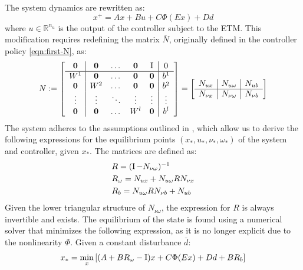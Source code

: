 \documentclass{ifacconf}
\theoremstyle{plain}
\begin{document}
The system dynamics are rewritten as:
\begin{equation}\label{eqn:system-dynamics}
x^{+} = A x + B u + C \Phi(E x) + D d
\end{equation}
where $u \in \mathbb{R}^{n_u}$ is the output of the controller subject to the ETM. This modification requires redefining the matrix $\overbar N$, originally defined in the controller policy \eqref{eqn:first-N}, as:
\begin{equation}\label{eqn:last-N}
  N := \left[\begin{matrix}
    \begin{array}{c | c c c c | c}
      \operatorname{\mathbf{0}} & \operatorname{\mathbf{0}} & \dots & \operatorname{\mathbf{0}} & \operatorname{I} & 0 \\ 
      \hline
      W^1 & \operatorname{\mathbf{0}} & \dots & \operatorname{\mathbf{0}} & \operatorname{\mathbf{0}} & b^1 \\
      \operatorname{\mathbf{0}} & W^2 & \dots & \operatorname{\mathbf{0}} & \operatorname{\mathbf{0}} & b^2 \\
      \vdots & \vdots & \ddots & \vdots & \vdots & \vdots \\
      \operatorname{\mathbf{0}} & \operatorname{\mathbf{0}} & \dots & W^l & \operatorname{\mathbf{0}} & b^l
    \end{array}
  \end{matrix}\right] = \left[\begin{matrix}
    \begin{array}{c | c | c}
    N_{u x} & N_{u \omega} & N_{u b} \\
    \hline
    N_{\nu x} & N_{\nu \omega} & N_{\nu b}
    \end{array} 
  \end{matrix}\right]
\end{equation}
The system adheres to the assumptions outlined in \citep[Lemma 2]{css-extended}, which allow us to derive the following expressions for the equilibrium points $\left( x_*, u_*, \nu_*, \omega_* \right)$ of the system and controller, given $x_*$. The matrices are defined as:
\begin{equation}
    \begin{aligned}
         &R = (\operatorname{I} - N_{\nu \omega})^{-1}\\
         &R_{\omega} = N_{u x} + N_{u \omega} R N_{\nu x}\\
         &R_b = N_{u \omega} R N_{\nu b} + N_{u b}
    \end{aligned}
\end{equation}
Given the lower triangular structure of $N_{\nu \omega}$, the expression for $R$ is always invertible and exists. The equilibrium of the state is found using a numerical solver that minimizes the following expression, as it is no longer explicit due to the nonlinearity $\Phi$. Given a constant disturbance $\bar{d}$:
\begin{equation}
  x_* = \min_{x} \left[(A + B R_{\omega} - \operatorname{I}) x + C \Phi(E x) + D \relax{d} + B R_b \right]
\end{equation}
\end{document}
